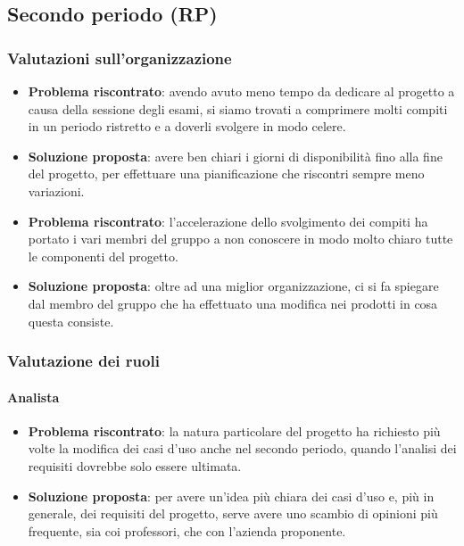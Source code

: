     \subsection{Secondo periodo (RP)}\label{valutazioni per il miglioramento:RP}
    
    \subsubsection{Valutazioni sull'organizzazione}
        \begin{itemize}
            \item \textbf{Problema riscontrato}: avendo avuto meno tempo da dedicare al progetto a causa della sessione degli esami, si siamo trovati a comprimere molti compiti in un periodo ristretto e a doverli svolgere in modo celere.
            \item \textbf{Soluzione proposta}: avere ben chiari i giorni di disponibilità fino alla fine del progetto, per effettuare una pianificazione che riscontri sempre meno variazioni.
            \item \textbf{Problema riscontrato}: l'accelerazione dello svolgimento dei compiti ha portato i vari membri del gruppo a non conoscere in modo molto chiaro tutte le componenti del progetto.
            \item \textbf{Soluzione proposta}: oltre ad una miglior organizzazione, ci si fa spiegare dal membro del gruppo che ha effettuato una modifica nei prodotti in cosa questa consiste.
        \end{itemize}
    
    \subsubsection{Valutazione dei ruoli}
        
        \paragraph{Analista}
            \begin{itemize}
                \item \textbf{Problema riscontrato}: la natura particolare del progetto ha richiesto più volte la modifica dei casi d'uso anche nel secondo periodo, quando l'analisi dei requisiti dovrebbe solo essere ultimata.
                \item \textbf{Soluzione proposta}: per avere un'idea più chiara dei casi d'uso e, più in generale, dei requisiti del progetto, serve avere uno scambio di opinioni più frequente, sia coi professori, che con l'azienda proponente.
            \end{itemize}
        
